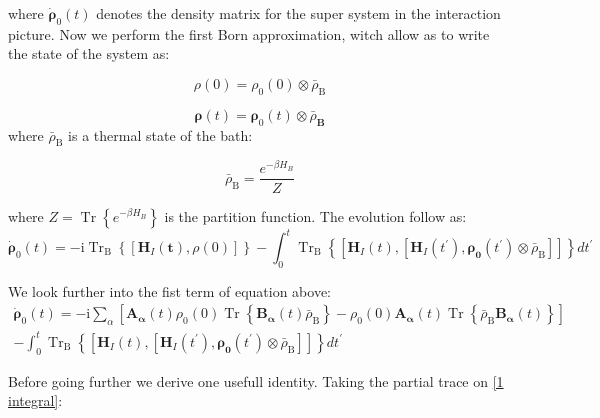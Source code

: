 \documentclass[%
preprint,
onecolumn,
notitlepag,
 amsmath,amssymb,
 aps,
 pra,
]{revtex4-2}
\begin{document}
\begin{itemize}
where  $\dot{\boldsymbol{\rho}}_0(t)$ denotes the density matrix for the  super system in the interaction picture.  Now we perform the first Born approximation, witch allow as to write the state of the system as: 

\begin{equation}
\rho(0)=\rho_{\mathrm{0}} (0) \otimes \bar{\rho}_{\mathrm{B}}
\end{equation}


\begin{equation}
\boldsymbol{\rho}(t)=\boldsymbol{\rho}_0(t) \otimes \bar{\rho}_{\mathbf{B}}
\end{equation}
where  $\bar{\rho}_{\mathrm{B}}$ is a thermal state of the bath:

\begin{equation}
   \bar{\rho}_{\mathrm{B}}= \frac{e^{- \beta H_B}}{Z}
\end{equation}

where $Z= \operatorname{Tr} \left\{ e^{- \beta H_B} \right\}$ is the partition function. The evolution follow as:
\begin{equation}
 \dot{\boldsymbol{\rho}}_0(t)=-\mathrm{i} \operatorname{Tr}_{\mathrm{B}}\left\{\left[\boldsymbol{H}_{I}(\boldsymbol{t}), \rho(0)\right]\right\}-\int_{0}^{t} \operatorname{Tr}_{\mathrm{B}}\left\{\left[\boldsymbol{H}_{I}(t),\left[\boldsymbol{H}_{I}\left(t^{\prime}\right),\boldsymbol{ \rho_{0}} \left(t^{\prime}\right) \otimes \bar{\rho}_{\mathrm{B}}\right]\right]\right\} d t^{\prime}
\end{equation}


We look further into the fist term of equation above:
\begin{align}
 \dot{\boldsymbol{\rho}}_0(t)=
-\mathrm{i} \sum_{\alpha}\left[\boldsymbol{A}_{\boldsymbol{\alpha}}(t) \rho_0(0) \operatorname{Tr}\left\{\boldsymbol{B}_{\boldsymbol{\alpha}}(t) \bar{\rho}_{\mathrm{B}}\right\}-\rho_0(0)  \boldsymbol{A}_{\boldsymbol{\alpha}}(t) \operatorname{Tr}\left\{\bar{\rho}_{\mathrm{B}} \boldsymbol{B}_{\boldsymbol{\alpha}}(t)\right\}\right] \\
-\int_{0}^{t} \operatorname{Tr}_{\mathrm{B}}\left\{\left[\boldsymbol{H}_{I}(t),\left[\boldsymbol{H}_{I}\left(t^{\prime}\right), \boldsymbol{ \rho_{0}}\left(t^{\prime}\right) \otimes \bar{\rho}_{\mathrm{B}}\right]\right]\right\} d t^{\prime}   
\label{RD1}
\end{align}



Before going further we derive one usefull identity. Taking the partial trace on \eqref{1 integral}: 


\end{itemize}
\end{document}

